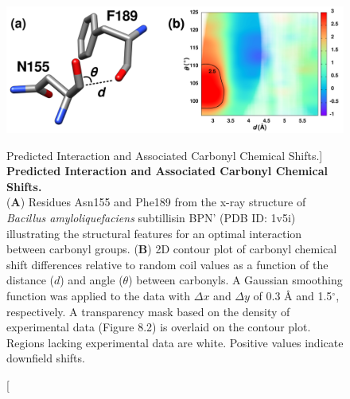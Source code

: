 \begin{figure}[ht!]
\includegraphics[width=6.5in]{figs/npistar/01.png}
\caption
      [Predicted \npistar{} Interaction and Associated Carbonyl \cnmr{}
       Chemical Shifts.]{
  {\bf Predicted \npistar{} Interaction and Associated Carbonyl \cnmr{}
       Chemical Shifts.
  }
  \\
  ({\bf A}) Residues Asn155 and Phe189 from the x-ray structure of
  \emph{Bacillus amyloliquefaciens} subtillisin BPN' (PDB ID: 1v5i)
  illustrating the structural features for an optimal \npistar{} interaction
  between carbonyl groups.
  ({\bf B}) 2D contour plot of carbonyl \cnmr{} chemical shift differences
  relative to random coil values as a function of the distance ($d$) and
  angle ($\theta$) between carbonyls. A Gaussian smoothing function was
  applied to the data with $\Delta x$ and $\Delta y$ of 0.3 \r{A} and
  1.5$^\circ$, respectively. A transparency mask based on the density of
  experimental data (Figure 8.2) is overlaid on the
  contour plot. Regions lacking experimental data are white.
  Positive values indicate downfield shifts.
}
\end{figure}

